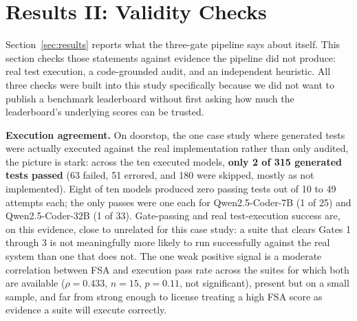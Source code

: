 \documentclass[conference]{IEEEtran}
\begin{document}
\section{Results II: Validity Checks}
\label{sec:validity}

Section~\ref{sec:results} reports what the three-gate pipeline says about
itself. This section checks those statements against evidence the pipeline
did not produce: real test execution, a code-grounded audit, and an
independent heuristic. All three checks were built into this study
specifically because we did not want to publish a benchmark leaderboard
without first asking how much the leaderboard's underlying scores can be
trusted.

\textbf{Execution agreement.} On doorstop, the one case study where generated
tests were actually executed against the real implementation rather than only
audited, the picture is stark: across the ten executed models, \textbf{only 2 of 315
generated tests passed} (63 failed, 51 errored, and 180 were skipped,
mostly as not implemented). Eight of ten models produced zero passing tests
out of 10 to 49 attempts each; the only passes were one each for
Qwen2.5-Coder-7B (1 of 25) and Qwen2.5-Coder-32B (1 of 33).
Gate-passing and real test-execution success are, on this evidence, close to
unrelated for this case study: a suite that clears Gates 1 through 3 is not
meaningfully more likely to run successfully against the real system than one
that does not. The one weak positive signal is a moderate correlation between
FSA and execution pass rate across the suites for which both are available
($\rho=0.433$, $n=15$, $p=0.11$, not significant), present but on a small sample, and far from
strong enough to license treating a high FSA score as evidence a suite will
execute correctly.
\end{document}
